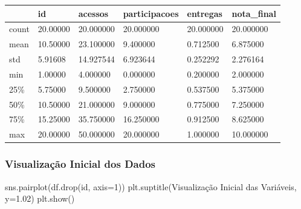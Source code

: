 \documentclass[
  letterpaper,
  DIV=11,
  numbers=noendperiod]{scrartcl}
\newenvironment{Shaded}{\begin{snugshade}}{\end{snugshade}}
\newcommand{\DecValTok}[1]{\textcolor[rgb]{0.68,0.00,0.00}{#1}}
\newcommand{\FloatTok}[1]{\textcolor[rgb]{0.68,0.00,0.00}{#1}}
\newcommand{\NormalTok}[1]{\textcolor[rgb]{0.00,0.23,0.31}{#1}}
\newcommand{\OperatorTok}[1]{\textcolor[rgb]{0.37,0.37,0.37}{#1}}
\newcommand{\StringTok}[1]{\textcolor[rgb]{0.13,0.47,0.30}{#1}}
\begin{document}
\begin{longtable}[]{@{}llllll@{}}
\toprule\noalign{}
& id & acessos & participacoes & entregas & nota\_final \\
\midrule\noalign{}
\endhead
\bottomrule\noalign{}
\endlastfoot
count & 20.00000 & 20.000000 & 20.000000 & 20.000000 & 20.000000 \\
mean & 10.50000 & 23.100000 & 9.400000 & 0.712500 & 6.875000 \\
std & 5.91608 & 14.927544 & 6.923644 & 0.252292 & 2.276164 \\
min & 1.00000 & 4.000000 & 0.000000 & 0.200000 & 2.000000 \\
25\% & 5.75000 & 9.500000 & 2.750000 & 0.537500 & 5.375000 \\
50\% & 10.50000 & 21.000000 & 9.000000 & 0.775000 & 7.250000 \\
75\% & 15.25000 & 35.750000 & 16.250000 & 0.912500 & 8.625000 \\
max & 20.00000 & 50.000000 & 20.000000 & 1.000000 & 10.000000 \\
\end{longtable}

\subsubsection{Visualização Inicial dos
Dados}\label{visualizauxe7uxe3o-inicial-dos-dados}

\begin{Shaded}
\begin{Highlighting}[]
\NormalTok{sns.pairplot(df.drop(}\StringTok{\textquotesingle{}id\textquotesingle{}}\NormalTok{, axis}\OperatorTok{=}\DecValTok{1}\NormalTok{))}
\NormalTok{plt.suptitle(}\StringTok{\textquotesingle{}Visualização Inicial das Variáveis\textquotesingle{}}\NormalTok{, y}\OperatorTok{=}\FloatTok{1.02}\NormalTok{)}
\NormalTok{plt.show()}
\end{Highlighting}
\end{Shaded}
\end{document}
